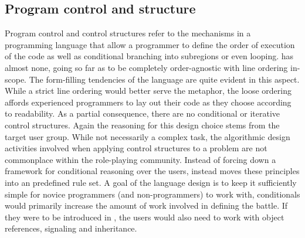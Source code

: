 \subsection{Program control and structure}
Program control and control structures refer to the mechanisms in a programming language that allow a programmer to define the order of execution of the code as well as conditional branching into subregions or even looping. \langname{} has almost none, going so far as to be completely order-agnostic with line ordering in-scope. 
The form-filling tendencies of the language are quite evident in this aspect. While a strict line ordering would better serve the metaphor, the loose ordering %
affords experienced programmers to lay out their code as they choose according to readability. As a partial consequence, there are no conditional or iterative control structures. 
Again the reasoning for this design choice stems from the target user group. While not necessarily a complex task, the algorithmic design activities involved when applying control structures to a problem are not commonplace within the role-playing community. Instead of forcing down a framework for conditional reasoning over the users, \langname{} instead moves these principles into an predefined rule set.
A goal of the language design is to keep it sufficiently simple for novice programmers (and non-programmers) to work with, conditionals would primarily increase the amount of work involved in defining the battle. If they were to be introduced in \langname{}, the users would also need to work with object references, signaling and inheritance.
